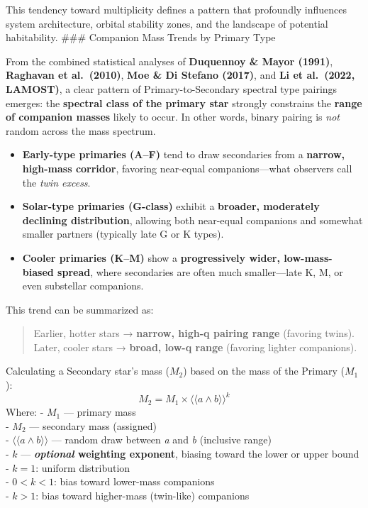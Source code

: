 \documentclass[
  letterpaper,
]{book}
\providecommand{\tightlist}{%
  \setlength{\itemsep}{0pt}\setlength{\parskip}{0pt}}
\begin{document}
This tendency toward multiplicity defines a pattern that profoundly
influences system architecture, orbital stability zones, and the
landscape of potential habitability. \#\#\# Companion Mass Trends by
Primary Type

From the combined statistical analyses of \textbf{Duquennoy \& Mayor
(1991)}, \textbf{Raghavan et al.~(2010)}, \textbf{Moe \& Di Stefano
(2017)}, and \textbf{Li et al.~(2022, LAMOST)}, a clear pattern of
Primary-to-Secondary spectral type pairings emerges: the
\textbf{spectral class of the primary star} strongly constrains the
\textbf{range of companion masses} likely to occur. In other words,
binary pairing is \emph{not} random across the mass spectrum.

\begin{itemize}
\tightlist
\item
  \textbf{Early-type primaries (A--F)} tend to draw secondaries from a
  \textbf{narrow, high-mass corridor}, favoring near-equal
  companions---what observers call the \emph{twin excess}.\\
\item
  \textbf{Solar-type primaries (G-class)} exhibit a \textbf{broader,
  moderately declining distribution}, allowing both near-equal
  companions and somewhat smaller partners (typically late G or K
  types).\\
\item
  \textbf{Cooler primaries (K--M)} show a \textbf{progressively wider,
  low-mass-biased spread}, where secondaries are often much
  smaller---late K, M, or even substellar companions.
\end{itemize}

This trend can be summarized as:

\begin{quote}
Earlier, hotter stars → \textbf{narrow, high-q pairing range} (favoring
twins).\\
Later, cooler stars → \textbf{broad, low-q range} (favoring lighter
companions).
\end{quote}

Calculating a Secondary star's mass (\(M_2\)) based on the mass of the
Primary (\(M_1\)): \[
M_2 = M_1 \times ⟨⟨a ∧ b⟩⟩^{k}
\] Where: - \(M_1\) --- primary mass\\
- \(M_2\) --- secondary mass (assigned)\\
- \(⟨⟨a ∧ b⟩⟩\) --- random draw between \emph{a} and \emph{b} (inclusive
range)\\
- \(k\) --- \textbf{\emph{optional} weighting exponent}, biasing toward
the lower or upper bound\\
- \(k = 1\): uniform distribution\\
- \(0 < k < 1\): bias toward lower-mass companions\\
- \(k > 1\): bias toward higher-mass (twin-like) companions
\end{document}
